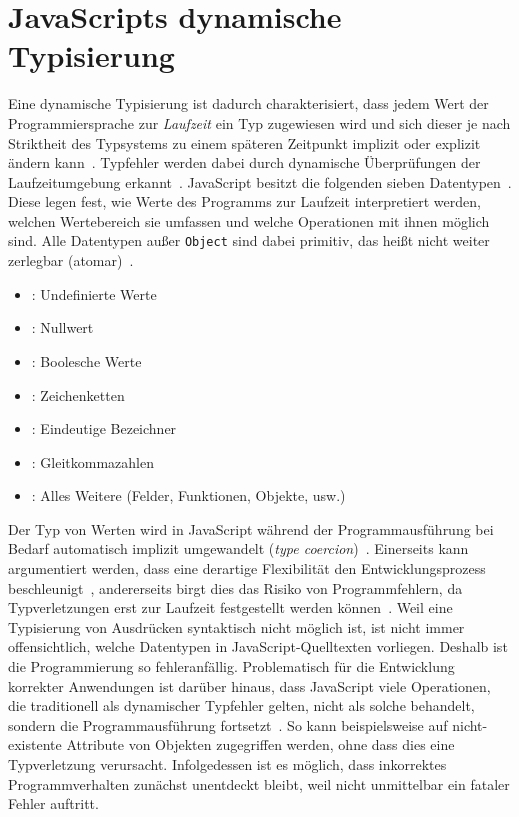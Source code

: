 \section{JavaScripts dynamische Typisierung}

Eine dynamische Typisierung ist dadurch charakterisiert, dass jedem Wert der Programmiersprache zur \emph{Laufzeit} ein Typ zugewiesen wird und sich dieser je nach Striktheit des Typsystems zu einem späteren Zeitpunkt implizit oder explizit ändern kann~\autocite[45]{WALDMANN:PPS}. Typfehler werden dabei durch dynamische Überprüfungen der Laufzeitumgebung erkannt~\autocite[37]{CARDELLI:TYPE_SYSTEMS}.
JavaScript besitzt die folgenden sieben Datentypen~\autocite[25]{ECMASCRIPT:2019}. Diese legen fest, wie Werte des Programms zur Laufzeit interpretiert werden, welchen Wertebereich sie umfassen und welche Operationen mit ihnen möglich sind. Alle Datentypen außer \texttt{Object} sind dabei primitiv, das heißt nicht weiter zerlegbar (atomar)~\autocite[8]{ECMASCRIPT:2019}.

\begin{itemize}
  \item {}: Undefinierte Werte
  \item {}: Nullwert
  \item {}: Boolesche Werte
  \item {}: Zeichenketten
  \item {}: Eindeutige Bezeichner
  \item {}: Gleitkommazahlen
  \item {}: Alles Weitere (Felder, Funktionen, Objekte, usw.)
\end{itemize}

Der Typ von Werten wird in JavaScript während der Programmausführung bei Bedarf automatisch implizit umgewandelt (\emph{type coercion})~\autocite{RICHARDS:2010}. Einerseits kann argumentiert werden, dass eine derartige Flexibilität den Entwicklungsprozess beschleunigt~\autocite[1]{FLOW:PAPER}, andererseits birgt dies das Risiko von Programmfehlern, da Typverletzungen erst zur Laufzeit festgestellt werden können~\autocite{ANDERSON:2005}. Weil eine Typisierung von Ausdrücken syntaktisch nicht möglich ist, ist nicht immer offensichtlich, welche Datentypen in JavaScript-Quelltexten vorliegen. Deshalb ist die Programmierung so fehleranfällig. Problematisch für die Entwicklung korrekter Anwendungen ist darüber hinaus, dass JavaScript viele Operationen, die traditionell als dynamischer Typfehler gelten, nicht als solche behandelt, sondern die Programmausführung fortsetzt~\autocite{NIKHIL:2014}. So kann beispielsweise auf nicht-existente Attribute von Objekten zugegriffen werden, ohne dass dies eine Typverletzung verursacht. Infolgedessen ist es möglich, dass inkorrektes Programmverhalten zunächst unentdeckt bleibt, weil nicht unmittelbar ein fataler Fehler auftritt.

